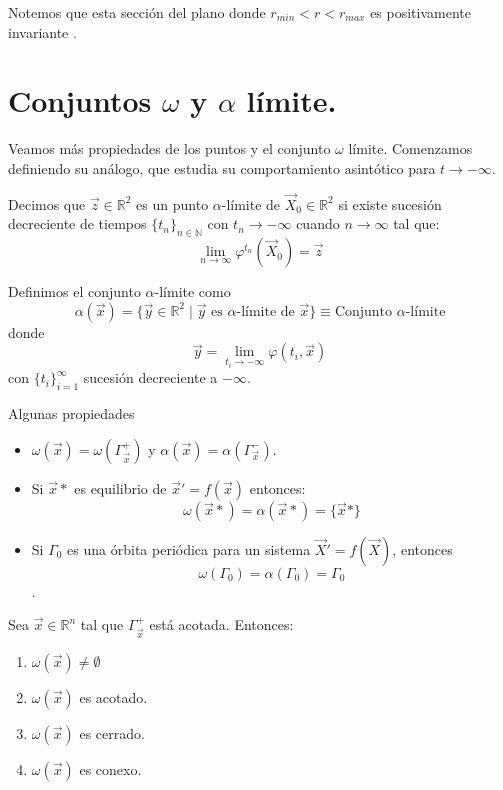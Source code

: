 Notemos que esta sección del plano donde $r_{min}<r<r_{max}$ es positivamente invariante \cite{hirsch2012differential}.
\newpage
\section{Conjuntos $\omega$ y $\alpha$ límite.}

Veamos más propiedades de los puntos y el conjunto $\omega$ límite. Comenzamos definiendo su análogo,
que estudia su comportamiento asintótico para $t\to-\infty$.\\

\begin{definition}
	Decimos que $\vec{z}\in\mathbb{R}^2$ es un punto $\alpha$-límite
	de $\vec{X}_0\in\mathbb{R}^2$ si existe sucesión decreciente de
	tiempos $\{t_n\}_{n\in\mathbb{N}}$
	con $t_n \to-\infty$ cuando $n\to \infty$ tal que:
	$$\lim_{n\to\infty}\varphi^{t_n}(\vec{X}_0)=\vec{z}$$
\end{definition}

\begin{definition}
	Definimos el conjunto $\alpha$-límite como $$\alpha(\vec{x})=\{\vec{y}\in\mathbb{R}^2\mid\vec{y}
		\text{ es } \alpha\text{-límite de }\vec{x}\}\equiv\text{Conjunto }\alpha\text{-límite}$$
	donde
	$$\vec{y}=\lim_{t_i\to-\infty}\varphi(t_i,\vec{x})$$
	con $\{t_i\}_{i=1}^{\infty}$ sucesión decreciente a $-\infty$.
\end{definition}

Algunas propiedades
\begin{itemize}
	\item $\omega(\vec{x})=\omega(\varGamma_{\vec{x}}^{+})$
	      y $\alpha(\vec{x})=\alpha(\varGamma_{\vec{x}}^{-})$.\\
	\item Si $\vec{x}*$ es equilibrio de $\vec{x}'=f(\vec{x})$ entonces:
	      $$\omega(\vec{x}*)=\alpha(\vec{x}*)=\{\vec{x}*\}$$
	\item Si $\varGamma_0$ es una órbita periódica para un sistema $\vec{X}'=f(\vec{X})$, entonces
	      $$\omega(\varGamma_0)=\alpha(\varGamma_0)=\varGamma_0$$.
\end{itemize}

\begin{lemma}
	Sea $\vec{x}\in\mathbb{R}^n$ tal que $\Gamma_{\vec{x}}^+$ está acotada.
	Entonces:
	\begin{enumerate}
		\item $\omega(\vec{x})\neq\emptyset$
		\item $\omega(\vec{x})$ es acotado.
		\item $\omega(\vec{x})$ es cerrado.
		\item $\omega(\vec{x})$ es conexo.
	\end{enumerate}
\end{lemma}

